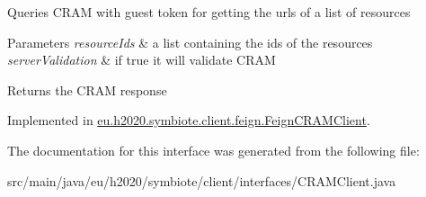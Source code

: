 Queries C\+R\+AM with guest token for getting the urls of a list of resources


\begin{DoxyParams}{Parameters}
{\em resource\+Ids} & a list containing the ids of the resources \\
\hline
{\em server\+Validation} & if true it will validate C\+R\+AM \\
\hline
\end{DoxyParams}
\begin{DoxyReturn}{Returns}
the C\+R\+AM response 
\end{DoxyReturn}


Implemented in \hyperlink{classeu_1_1h2020_1_1symbiote_1_1client_1_1feign_1_1FeignCRAMClient_abbf69636e4cb53f646335db80c10c3ca}{eu.\+h2020.\+symbiote.\+client.\+feign.\+Feign\+C\+R\+A\+M\+Client}.



The documentation for this interface was generated from the following file\+:\begin{DoxyCompactItemize}
\item 
src/main/java/eu/h2020/symbiote/client/interfaces/C\+R\+A\+M\+Client.\+java\end{DoxyCompactItemize}
